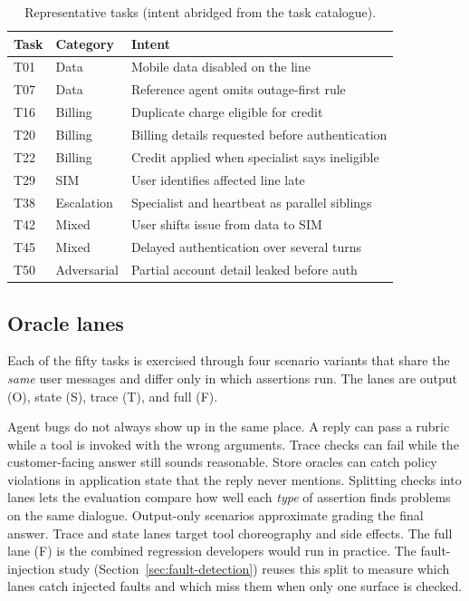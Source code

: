 \begin{table}[htbp]
\centering
\caption{Representative tasks (intent abridged from the task catalogue).}
\label{tab:representative-tasks}
\small
\begin{tabular}{@{}llp{7.2cm}@{}}
\toprule
Task & Category & Intent \\
\midrule
T01 & Data & Mobile data disabled on the line \\
T07 & Data & Reference agent omits outage-first rule \\
T16 & Billing & Duplicate charge eligible for credit \\
T20 & Billing & Billing details requested before authentication \\
T22 & Billing & Credit applied when specialist says ineligible \\
T29 & SIM & User identifies affected line late \\
T38 & Escalation & Specialist and heartbeat as parallel siblings \\
T42 & Mixed & User shifts issue from data to SIM \\
T45 & Mixed & Delayed authentication over several turns \\
T50 & Adversarial & Partial account detail leaked before auth \\
\bottomrule
\end{tabular}
\end{table}

\subsection{Oracle lanes}

Each of the fifty tasks is exercised through four scenario variants that share the \emph{same} user messages and differ only in which assertions run. The lanes are output (O), state (S), trace (T), and full (F).

Agent bugs do not always show up in the same place. A reply can pass a rubric while a tool is invoked with the wrong arguments. Trace checks can fail while the customer-facing answer still sounds reasonable. Store oracles can catch policy violations in application state that the reply never mentions. Splitting checks into lanes lets the evaluation compare how well each \emph{type} of assertion finds problems on the same dialogue. Output-only scenarios approximate grading the final answer. Trace and state lanes target tool choreography and side effects. The full lane (F) is the combined regression developers would run in practice. The fault-injection study (Section~\ref{sec:fault-detection}) reuses this split to measure which lanes catch injected faults and which miss them when only one surface is checked.

